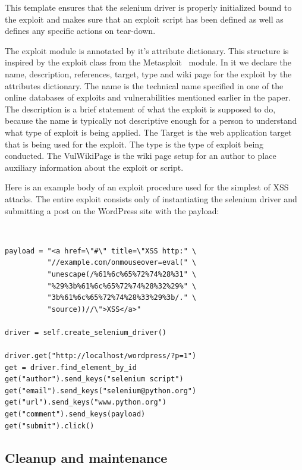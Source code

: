 \documentclass[letterpaper,twocolumn,10pt]{article}
\begin{document}
This template ensures that the selenium driver is properly initialized bound to the exploit and makes sure that an exploit script has been defined as well as defines any specific actions on tear-down.\par

The exploit module is annotated by it's attribute dictionary. This structure is inspired by the exploit class from the Metasploit~\cite{MetaSploit:2012:Online} module. In it we declare the name, description, references, target, type and wiki page for the exploit by the attributes dictionary.  The name is the technical name specified in one of the online databases of exploits and vulnerabilities mentioned earlier in the paper.  The description is a brief statement of what the exploit is supposed to do, because the name is typically not descriptive enough for a person to understand what type of exploit is being applied.  The Target is the web application target that is being used for the exploit.  The type is the type of exploit being conducted.  The VulWikiPage is the wiki page setup for an author to place auxiliary information about the exploit or script.

Here is an example body of an exploit procedure used for the simplest of XSS attacks.  The entire exploit consists only of instantiating the selenium driver and submitting a post on the WordPress site with the payload: 

\begin{minipage}{\textwidth}
{\tt \footnotesize
\begin{lstlisting}
payload = "<a href=\"#\" title=\"XSS http:" \
          "//example.com/onmouseover=eval(" \
          "unescape(/%61%6c%65%72%74%28%31" \
          "%29%3b%61%6c%65%72%74%28%32%29%" \
          "3b%61%6c%65%72%74%28%33%29%3b/." \
          "source))//\">XSS</a>"

driver = self.create_selenium_driver()

driver.get("http://localhost/wordpress/?p=1")
get = driver.find_element_by_id
get("author").send_keys("selenium script")
get("email").send_keys("selenium@python.org")
get("url").send_keys("www.python.org")
get("comment").send_keys(payload)
get("submit").click()
\end{lstlisting}
}
\end{minipage}

\subsection {Cleanup and maintenance}
\end{document}
